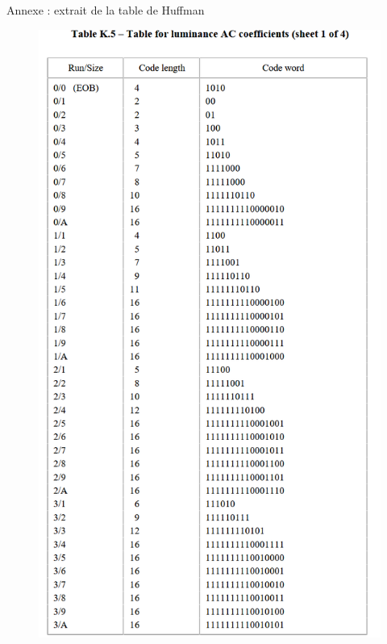 \documentclass[xcolor=dvipsnames]{beamer}
\begin{document}
\begin{frame}{Annexe : extrait de la table de Huffman} 

    \hfill
    \begin{minipage}{.49\textwidth}
        \centering
        \begin{figure}
            \includegraphics[width=.7\linewidth]{huffman1.png}
        \end{figure}
    \end{minipage}
    \hfill
    \begin{minipage}{.49\textwidth}
        \centering
        \begin{figure}

\end{figure}
\end{minipage}
\end{frame}
\end{document}

